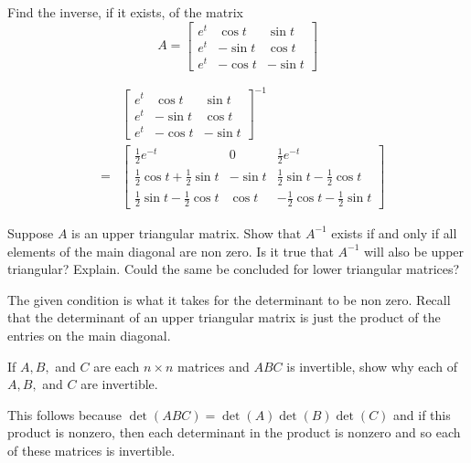 \documentclass{ximera}
\begin{document}
\begin{problem}\label{prb:7.39} Find the inverse, if it exists, of the matrix
\begin{equation*}
A =
\left[
\begin{array}{ccc}
e^{t} & \cos t & \sin t \\
e^{t} & -\sin t & \cos t \\
e^{t} & -\cos t & -\sin t
\end{array}
\right]
\end{equation*}
\begin{hint}
\begin{eqnarray*}
&&\left[
\begin{array}{ccc}
e^{t} & \cos t & \sin t \\
e^{t} & -\sin t & \cos t \\
e^{t} & -\cos t & -\sin t
\end{array}
\right] ^{-1} \\
&=&\left[
\begin{array}{ccc}
\frac{1}{2}e^{-t} & 0 & \frac{1}{2}e^{-t} \\
\frac{1}{2}\cos t+\frac{1}{2}\sin t & -\sin t & \frac{1}{2}\sin t-\frac{1}{2}
\cos t \\
\frac{1}{2}\sin t-\frac{1}{2}\cos t & \cos t & -\frac{1}{2}\cos t-\frac{1}{2}
\sin t
\end{array}
\right]
\end{eqnarray*}
\end{hint}
\end{problem}

\begin{problem}\label{prb:7.40} Suppose $A$ is an upper triangular matrix. Show that $A^{-1}$ exists
if and only if all elements of the main diagonal are non zero. Is it true
that $A^{-1}$ will also be upper triangular? Explain. Could the same be concluded for lower triangular matrices?
\begin{hint}
The given condition is what it takes for the
determinant to be non zero. Recall that the determinant of an upper
triangular matrix is just the product of the entries on the main diagonal.
\end{hint}
\end{problem}

\begin{problem}\label{prb:7.41} If $A,B,$ and $C$ are each $n\times n$ matrices and $ABC$ is
invertible, show why each of $A,B,$ and $C$ are invertible.
\begin{hint}
This follows
because $\det \left( ABC\right) =\det \left( A\right) \det \left( B\right)
\det \left( C\right) $ and if this product is nonzero, then each determinant
in the product is nonzero and so each of these matrices is invertible.
\end{hint}
\end{problem}
\end{document}
